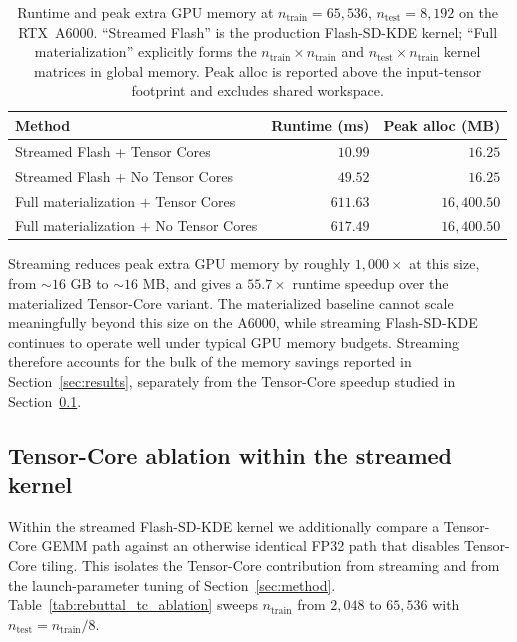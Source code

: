 \begin{table}[t]
  \centering
  \small
  \setlength{\tabcolsep}{4pt}
  \begin{tabular}{lrr}
    \toprule
    Method & Runtime (ms) & Peak alloc (MB) \\
    \midrule
    Streamed Flash + Tensor Cores      & $10.99$  & $16.25$       \\
    Streamed Flash + No Tensor Cores   & $49.52$  & $16.25$       \\
    Full materialization + Tensor Cores& $611.63$ & $16{,}400.50$ \\
    Full materialization + No Tensor Cores & $617.49$ & $16{,}400.50$ \\
    \bottomrule
  \end{tabular}
  \caption{Runtime and peak extra GPU memory at $n_{\text{train}} = 65{,}536$,
           $n_{\text{test}} = 8{,}192$ on the RTX~A6000.
           ``Streamed Flash'' is the production Flash-SD-KDE kernel;
           ``Full materialization'' explicitly forms the
           $n_{\text{train}} \times n_{\text{train}}$ and
           $n_{\text{test}} \times n_{\text{train}}$ kernel matrices in
           global memory.
           Peak alloc is reported above the input-tensor footprint and
           excludes shared workspace.}
  \label{tab:rebuttal_materialization}
\end{table}

Streaming reduces peak extra GPU memory by roughly $1{,}000\times$ at this
size, from $\sim\!16$ GB to $\sim\!16$ MB, and gives a $55.7\times$ runtime
speedup over the materialized Tensor-Core variant.
The materialized baseline cannot scale meaningfully beyond this size on the
A6000, while streaming Flash-SD-KDE continues to operate well under typical
GPU memory budgets.
Streaming therefore accounts for the bulk of the memory savings reported in
Section~\ref{sec:results}, separately from the Tensor-Core speedup studied in
Section~\ref{app:tc_ablation}.

\subsection{Tensor-Core ablation within the streamed kernel}
\label{app:tc_ablation}

Within the streamed Flash-SD-KDE kernel we additionally compare a Tensor-Core
GEMM path against an otherwise identical FP32 path that disables Tensor-Core
tiling.
This isolates the Tensor-Core contribution from streaming and from the
launch-parameter tuning of Section~\ref{sec:method}.
Table~\ref{tab:rebuttal_tc_ablation} sweeps $n_{\text{train}}$ from $2{,}048$
to $65{,}536$ with $n_{\text{test}} = n_{\text{train}}/8$.

